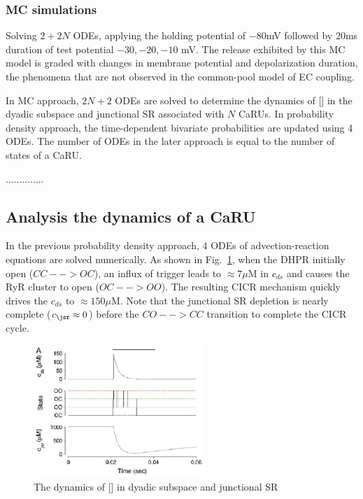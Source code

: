 \subsubsection{MC simulations}
\label{sec:mc-simulations}

Solving $2+2N$ ODEs, applying the holding potential of $-80$mV
followed by 20ms duration of test potential $-30, -20, -10$ mV. The
 release exhibited by this MC model is graded with changes
in membrane potential and depolarization duration, the phenomena that
are not observed in the common-pool model of EC coupling.


In MC approach, $2N+2$ ODEs are solved to determine the dynamics of
[] in the dyadic subspace and junctional SR associated with
$N$ CaRUs. In probability density approach, the time-dependent
bivariate probabilities are updated using 4 ODEs. The number of ODEs
in the later approach is equal to the number of states of a CaRU.


..............

\subsection{Analysis the dynamics of a CaRU}
\label{sec:analys-dynam-caru}

In the previous probability density approach, 4 ODEs of
advection-reaction equations are solved numerically. As shown in
Fig.~\ref{fig:Ca_ds_jsr}, when the DHPR initially open ($CC-->OC$), an
influx of trigger  leads to $\approx 7\mu$M in $c_{ds}$ and
causes the RyR cluster to open ($OC-->OO$). The resulting CICR
mechanism quickly drives the $c_{ds}$ to $\approx 150\mu$M. Note that
the junctional SR depletion is nearly complete ($c_\jsr\approx 0$)
before the $CO-->CC$ transition to complete the CICR cycle. 

\begin{figure}[hbt]
  \centerline{\includegraphics[height=5cm]{./images/Ca_ds_jsr.eps}}
  \caption{The dynamics of [] in dyadic subspace and
    junctional SR}
  \label{fig:Ca_ds_jsr}
\end{figure}

